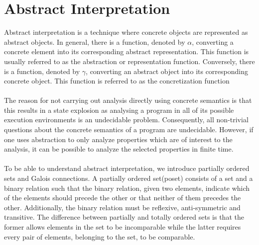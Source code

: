 \documentclass{kththesis}
\newcommand{\fbcomment}[1]{{#1}}
\renewcommand{\fbcomment}[1]{}
\begin{document}

\section{Abstract Interpretation}\label{sec:AbsInt}
\fbcomment{\color{red}Goal: Give the reader a basic understanding of abstract interpretation.}
Abstract interpretation is a technique where concrete objects are represented as abstract objects. In general, there is a function, denoted by $\alpha$, converting a concrete element into its corresponding abstract representation. This function is usually referred to as the abstraction or representation function. Conversely, there is a function, denoted by $\gamma$, converting an abstract object into its corresponding concrete object. This function is referred to as the concretization function
\\ \\%
The reason for not carrying out analysis directly using concrete semantics is that this results in a state explosion as analysing a program in all of its possible execution environments is an undecidable problem\parencite{FRPatrick}. Consequently, all non-trivial questions about the concrete semantics of a program are undecidable. However, if one uses abstraction to only analyze properties which are of interest to the analysis, it can be possible to analyze the selected properties in finite time.
\\ \\
To be able to understand abstract interpretation, we introduce partially ordered sets\parencite{EoMPoset} and Galois connections\cite{galoisConnections}. A partially ordered set(poset) consists of a set and a binary relation such that the binary relation, given two elements, indicate which of the elements should precede the other or that neither of them precedes the other. Additionally, the binary relation must be reflexive, anti-symmetric and transitive. The difference between partially and totally ordered sets is that the former allows elements in the set to be incomparable while the latter requires every pair of elements, belonging to the set, to be comparable.
\end{document}
